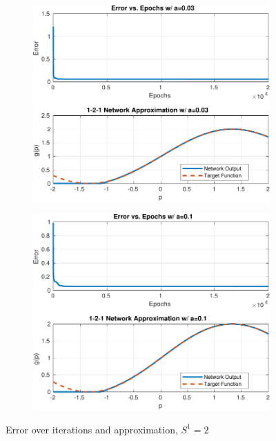 \begin{figure}[htpb]
	\vspace{1cm}
	\begin{subfigure}{0.47\textwidth}
		\centering
		\includegraphics[width=\textwidth]{../Problem 4/nn_images/1-2-1_NN_a=0.03.pdf}
		\caption{}
	\end{subfigure}
	\hfill
	\begin{subfigure}{0.47\textwidth}
		\centering
		\includegraphics[width=\textwidth]{../Problem 4/nn_images/1-2-1_NN_a=0.1.pdf}
		\caption{}
	\end{subfigure}
	\caption{Error over iterations and approximation, $S^1=2$}
	\label{fig:prob4_1-2-1_error_output}
\end{figure}

